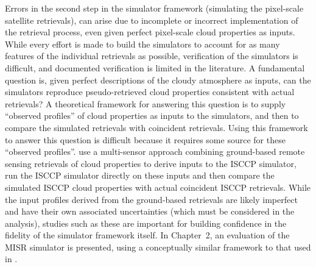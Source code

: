 Errors in the second step in the simulator framework (simulating the
pixel-scale satellite retrievals), can arise due to incomplete or
incorrect implementation of the retrieval process, even given perfect
pixel-scale cloud properties as inputs. While every effort is made to
build the simulators to account for as many features of the individual
retrievals as possible, verification of the simulators is difficult, and
documented verification is limited in the literature. A fundamental
question is, given perfect descriptions of the cloudy atmosphere as
inputs, can the simulators reproduce pseudo-retrieved cloud properties
consistent with actual retrievals? A theoretical framework for answering
this question is to supply ``observed profiles'' of cloud properties as
inputs to the simulators, and then to compare the simulated retrievals
with coincident retrievals. Using this framework to answer this question
is difficult because it requires some source for these ``observed
profiles''. \citet{mace_et_al_2011} use a multi-sensor approach
combining ground-based remote sensing retrievals of cloud properties to
derive inputs to the ISCCP simulator, run the ISCCP simulator directly
on these inputs and then compare the simulated ISCCP cloud properties
with actual coincident ISCCP retrievals. While the input profiles
derived from the ground-based retrievals are likely imperfect and have
their own associated uncertainties (which must be considered in the
analysis), studies such as these are important for building confidence
in the fidelity of the simulator framework itself. In Chapter~2, an
evaluation of the MISR simulator is presented, using a conceptually
similar framework to that used in \citet{mace_et_al_2011}.
